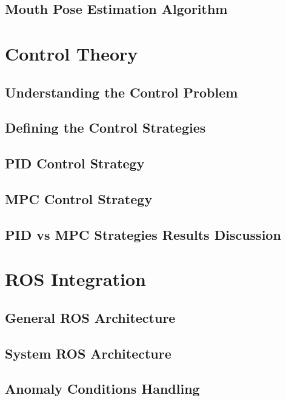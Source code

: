 \documentclass[11pt]{report} %
\begin{document}
\section{Mouth Pose Estimation Algorithm}

\chapter{Control Theory}

\section{Understanding the Control Problem}

\section{Defining the Control Strategies}

\section{PID Control Strategy}

\section{MPC Control Strategy}

\section{PID vs MPC Strategies Results Discussion}

\chapter{ROS Integration}

\section{General ROS Architecture}

\section{System ROS Architecture}

\section{Anomaly Conditions Handling}
\end{document}
